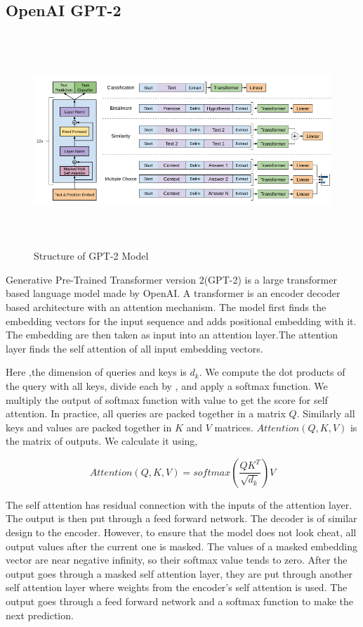 \documentclass[11pt,a4paper]{article}
\begin{document}
\subsection{OpenAI GPT-2}

\begin{figure}[t]
\begin{center}
\includegraphics[width=\textwidth,height=8cm]{GPT-2.png}
\caption{Structure of GPT-2 Model}   
\end{center}
\end{figure}

Generative Pre-Trained Transformer version 2(GPT-2) is a large transformer based language model made by OpenAI\cite{radford2019language}. A transformer is an encoder decoder based architecture with an attention mechanism. The model first finds the embedding vectors for the input sequence and adds positional embedding with it. The embedding are then taken as input into an attention layer.The attention layer finds the self attention of all input embedding vectors. 

Here ,the dimension of queries and keys is \(d_k\). We compute the dot products of the query with all keys, divide each by , and apply a softmax function. We multiply the output of softmax function with value to get the score for self attention. In practice, all queries are packed together in a matrix \(Q\). Similarly all keys and values are packed together in \(K\) and \(V\) matrices. \(Attention(Q,K,V)\) is the matrix of outputs. We calculate it using,

\[Attention(Q,K,V) = softmax(\frac{QK^T}{\sqrt{d_k}})V\]

The self attention has residual connection with the inputs of the attention layer. The output is then put through a feed forward network. The decoder is of similar design to the encoder. However, to ensure that the model does not look cheat, all output values after the current one is masked. The values of a masked embedding vector are near negative infinity, so their softmax value tends to zero. After the output goes through a masked self attention layer, they are put through another self attention layer where weights from the encoder's self attention is used. The output goes through a feed forward network and a softmax function to make the next prediction.
\end{document}
